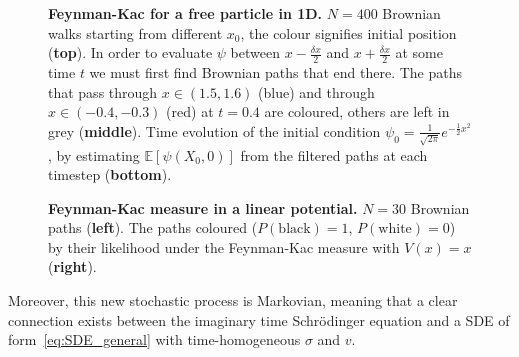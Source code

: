 \begin{figure}[H]
	\caption[Feynman-Kac for a free particle in 1D]{\textbf{Feynman-Kac for a free particle  in 1D.} $N=400$ Brownian walks starting from different $x_0$, the colour signifies initial position (\textbf{top}). In order to evaluate $\psi$ between $x-\frac{\delta x}{2}$ and $x+\frac{\delta x}{2}$ at some time $t$ we must first find Brownian paths that end there. The paths that pass through $x \in (1.5, 1.6)$ (blue) and through $x \in (-0.4,-0.3)$ (red) at $t=0.4$ are coloured, others are left in grey (\textbf{middle}). Time evolution of the initial condition $\psi_{0} = \frac{1}{\sqrt{2 \pi}} e^{-\frac{1}{2} x^{2}}$, by estimating ${\mathbb{E}}\left[\psi\left(X_{0}, 0\right)\right]$ from the filtered paths at each timestep (\textbf{bottom}).}
	\label{fig:fk_1d_example}
\end{figure}
\begin{figure}[t]
	\centering
	\caption[Feynman-Kac measure in a linear potential]{\textbf{Feynman-Kac measure in a linear potential.} 
		$N=30$ Brownian paths (\textbf{left}). The paths coloured ($P(\text{black})=1$, $P(\text{white})=0$) by their likelihood under the Feynman-Kac measure with $V(x)=x$ (\textbf{right}).}
	\label{fig:fkac_measure_reweight}
\end{figure}
Moreover, this new stochastic process is Markovian, meaning that a clear connection exists between the imaginary time Schr\" odinger equation and a SDE of form~\eqref{eq:SDE_general} with time-homogeneous $\sigma$ and $v$.
